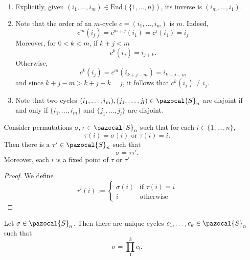 \begin{remark}
    \begin{enumerate}
        \item Explicitly, given $(i_1,\dots,i_m) \in \mathrm{End}(\{1,\dots,n\})$, its inverse is $(i_m,\dots,i_1)$.
        \item Note that the order of an $m$-cycle $c=(i_1,\dots,i_m)$ is $m$. Indeed,
        $$
            c^m(i_j)= c^{m+j}(i_1)=c^{j}(i_1)=i_j
        $$
        Moreover, for $0< k < m$, if $k+j<m$
        $$
            c^k(i_j) = i_{j+k}.
        $$
        Otherwise,
        $$
            c^{k}(i_j)= c^m(i_{k+j-m})=i_{k+j-m} 
        $$
        and since $k+j-m>k+j-k =j$, it follows that $c^k(i_j)\neq i_{j}$. 
        \item Note that two cycles $(i_1,\dots,i_m),(j_1,\dots,j_l)\in \pazocal{S}_n$ are disjoint if and only if $\{i_1,\dots,i_m\}$ and $\{j_1,\dots,j_l\}$ are disjoint.
    \end{enumerate}
\end{remark}
\begin{lemma}
    Consider permutations $\sigma,\tau\in \pazocal{S}_n$ such that for each $i\in \{1,\dots,n\}$, 
    $$
        \tau(i)=\sigma(i) \text{ or } \tau(i)=i.
    $$
    Then there is a $\tau'\in \pazocal{S}_n$ such that 
    $$
        \sigma = \tau\tau'.
    $$
    Moreover, each $i$ is a fixed point of $\tau$ or $\tau'$
\end{lemma}
\begin{proof}
    We define
    $$
        \tau'(i) := 
        \begin{cases}
            \sigma(i) & \text{if } \tau(i)=i\\
            i & \text{otherwise} 
        \end{cases}
    $$
\end{proof}
\begin{lemma}
    Let $\sigma\in \pazocal{S}_n$. Then there are unique cycles $c_1,\dots,c_k\in \pazocal{S}_n$ such that 
    $$
        \sigma = \prod_1^k c_l.
    $$
\end{lemma}
